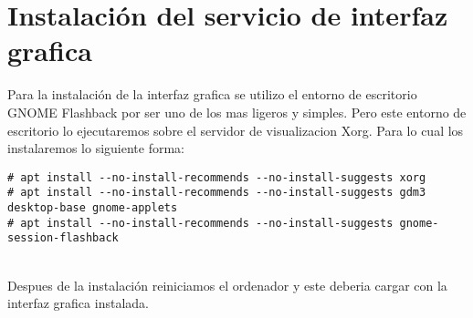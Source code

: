 \section{Instalación del servicio de interfaz grafica}
Para la instalación de la interfaz grafica se utilizo el entorno de escritorio GNOME Flashback por ser uno de los mas ligeros y simples. Pero este entorno de escritorio lo ejecutaremos sobre el servidor de visualizacion Xorg. Para lo cual los instalaremos lo siguiente forma:\\
\begin{verbatim}
# apt install --no-install-recommends --no-install-suggests xorg 
# apt install --no-install-recommends --no-install-suggests gdm3 desktop-base gnome-applets
# apt install --no-install-recommends --no-install-suggests gnome-session-flashback
\end{verbatim}
\\[1em]
Despues de la instalación reiniciamos el ordenador y este deberia cargar con la interfaz grafica instalada.

